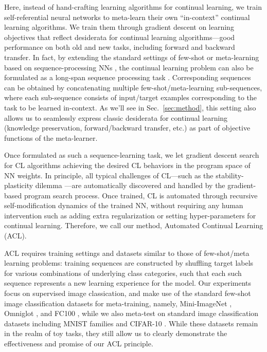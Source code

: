 \documentclass{article}
\begin{document}
Here, instead of hand-crafting learning algorithms for continual learning, we train self-referential neural networks \citep{Schmidhuber:92selfref,schmidhuber1987evolutionary} to meta-learn their own ``in-context'' continual learning algorithms. We train them through gradient descent on learning objectives that reflect desiderata for continual learning algorithms---good performance on both old and new tasks, including forward and backward transfer.
In fact, by extending the standard settings of few-shot or meta-learning based on sequence-processing NNs \citep{hochreiter2001learning, younger1999fixed, cotter1991learning, cotter1990fixed, mishra2018a}, the continual learning problem can also be formulated as a long-span sequence processing task \citep{IrieSCS22}.
Corresponding sequences can be obtained by concatenating multiple few-shot/meta-learning sub-sequences, where each sub-sequence consists of input/target examples corresponding to the task to be learned in-context.
As we'll see in Sec.~\ref{sec:method}, this setting also allows us to seamlessly express classic desiderata for continual learning (knowledge preservation, forward/backward transfer, etc.) as part of objective functions of the meta-learner.

Once formulated as such a sequence-learning task, we let gradient descent search for CL algorithms achieving the desired CL behaviors in the program space of NN weights.
In principle, all typical challenges of CL---such as the stability-plasticity dilemma \citep{grossberg82studies}---are automatically discovered and handled by the gradient-based program search process.
Once trained, CL is automated through recursive self-modification dynamics of the trained NN, without requiring any 
human intervention such as adding extra regularization or setting hyper-parameters for continual learning.
Therefore, we call our method, Automated Continual Learning (ACL).

ACL requires training settings and datasets similar to those of few-shot/meta learning problems: training sequences are constructed by shuffling target labels for various combinations of underlying class categories, such that each such sequence represents a new learning experience for the model.
Our experiments focus on supervised image classication, and make use of the standard few-shot image classification datasets for meta-training, namely, Mini-ImageNet \citep{VinyalsBLKW16, RaviL17}, Omniglot \citep{lake2015human}, and FC100 \citep{OreshkinLL18}, while we also meta-test on standard image classification datasets including MNIST families \citep{lecun1998mnist, xiao2017fashion} and CIFAR-10 \citep{krizhevsky}.
While these datasets remain in the realm of toy tasks,
they still allow us to clearly demonstrate the effectiveness and promise of our ACL principle.
\end{document}
